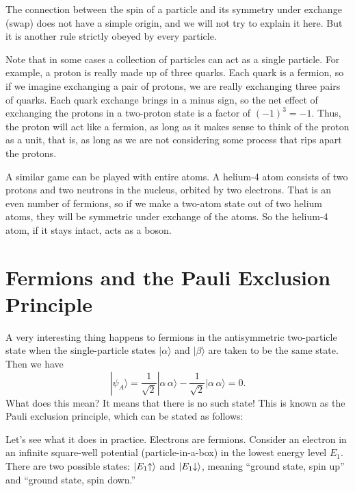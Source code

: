 The connection between the spin of a particle and its symmetry under
exchange (swap) does not have a simple origin, and we will not try to
explain it here.  But it is another rule strictly obeyed by every
particle.

Note that in some cases a collection of particles can act as a single
particle.  For example, a proton is really made up of three quarks.
Each quark is a fermion, so if we imagine exchanging a pair of
protons, we are really exchanging three pairs of quarks.  Each quark
exchange brings in a minus sign, so the net effect of exchanging the
protons in a two-proton state is a factor of $(-1)^3=-1$.  Thus, the proton
will act like a fermion, as long as it makes sense to think of the
proton as a unit, that is, as long as we are not considering some process
that rips apart the protons.

A similar game can be played with entire atoms.  A helium-4 atom
consists of two protons and two neutrons in the nucleus, orbited
by two electrons.  That is an even number of fermions, so if we make a
two-atom state out of two helium atoms, they will be symmetric under
exchange of the atoms.  So the helium-4 atom, if it stays intact, acts
as a boson.

\section{Fermions and the Pauli Exclusion Principle}
\label{sec:pauli_exclusion_principle}

A very interesting thing happens to fermions in the antisymmetric
two-particle state when the single-particle states $|\alpha\rangle$
and $|\beta\rangle$ are taken to be the same state.  Then we have
\begin{equation}
  |\psi_A\rangle =  \frac{1}{\sqrt 2}|\alpha\, \alpha\rangle - 
  \frac{1}{\sqrt 2}|\alpha\, \alpha\rangle
  = 0.
\end{equation}
What does this mean?  It means that there is no such state!  This is
known as the Pauli exclusion principle, which can be stated as
follows:


Let's see what it does in practice.  Electrons are fermions.  Consider
an electron in an infinite square-well potential (particle-in-a-box)
in the lowest energy level $E_1$. 
There are
two possible states: $|E_1\hspace{-1mm}\uparrow\rangle$ and
$|E_1\hspace{-1mm}\downarrow\rangle$, meaning ``ground state,
spin up'' and ``ground state, spin down.''

